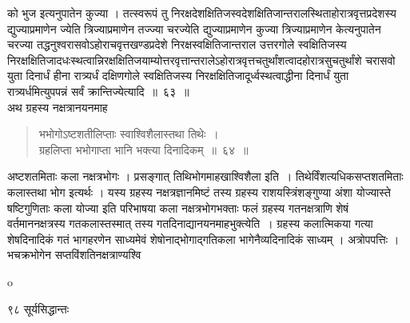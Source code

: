 \documentclass[11pt, openany]{book}
\begin{document}
\begin{sloppypar}
\noindent को भुज इत्यनुपातेन कुज्या । तत्स्वरूपं तु निरक्षदेशक्षितिजस्वदेशक्षितिजान्तरालस्थिताहोरात्रवृत्तप्रदेशस्य द्युज्याप्रमाणेन ज्येति त्रिज्याप्रमाणेन तज्ज्या चरज्येति द्युज्याप्रमाणेन कुज्या त्रिज्याप्रमाणेन केत्यनुपातेन चरज्या तद्धनुश्वरासवोऽहोराचवृत्तखण्डप्रदेशे निरक्षस्वक्षितिजान्तराल उत्तरगोले स्वक्षितिजस्य निरक्षक्षितिजादधःस्थत्वान्निरक्षक्षितिजयाम्योत्तरवृत्तान्तरालेऽहोरात्रवृत्तचतुर्थांशत्वादहोरात्रसुचतुर्थांशे चरासवो युता दिनार्धं हीना रात्र्यर्धं दक्षिणगोले स्वक्षितिजस्य निरक्षक्षितिजादूर्ध्वस्थत्वाद्धीना दिनार्धं युता रात्र्यर्धमित्युपपन्नं सर्वं क्रान्तिज्येत्यादि~॥~६३~॥\\
\noindent अथ ग्रहस्य नक्षत्रानयनमाह\textendash
\end{sloppypar}
\begin{quote}

 {\ssi भभोगोऽष्टशतीलिप्ताः स्वाश्विशैलास्तथा तिथेः~।\\
ग्रहलिप्ता भभोगाप्ता भानि भक्त्या दिनादिकम्~॥~६४~॥}
\end{quote}
\begin{sloppypar}
 अष्टशतमिताः कला नक्षत्रभोगः । प्रसङ्गात् तिथिभोगमाह\textendash खाश्विशैला इति~। तिथेर्विंशत्यधिकसप्तशतमिताः कलास्तथा भोग इत्यर्थः । यस्य ग्रहस्य नक्षत्रज्ञानमिष्टं तस्य ग्रहस्य राशयस्त्रिंशङ्गुण्या अंशा योज्यास्ते षष्टिगुणिताः कला योज्या इति परिभाषया कला नक्षत्रभोगभक्ताः फलं ग्रहस्य गतनक्षत्राणि शेषं वर्तमाननक्षत्रस्य गतकलास्तस्मात् तस्य गतदिनाद्यानयनमाह\textendash भुक्त्येति~। ग्रहस्य कलात्मिकया गत्या शेषदिनादिकं गतं भागहरणेन साध्यमेवं शेषोनाद्भोगाद्गतिकला भागेनैव्यदिनादिकं साध्यम् । अत्रोपपत्तिः । भचक्रभोगेन सप्तविंशतिनक्षत्राण्यश्वि\textendash
\end{sloppypar}
{\tiny{o}}

\newpage


\noindent ९८ \hspace{4cm} सूर्यसिद्धान्तः 
\vspace{1cm}
\end{document}
